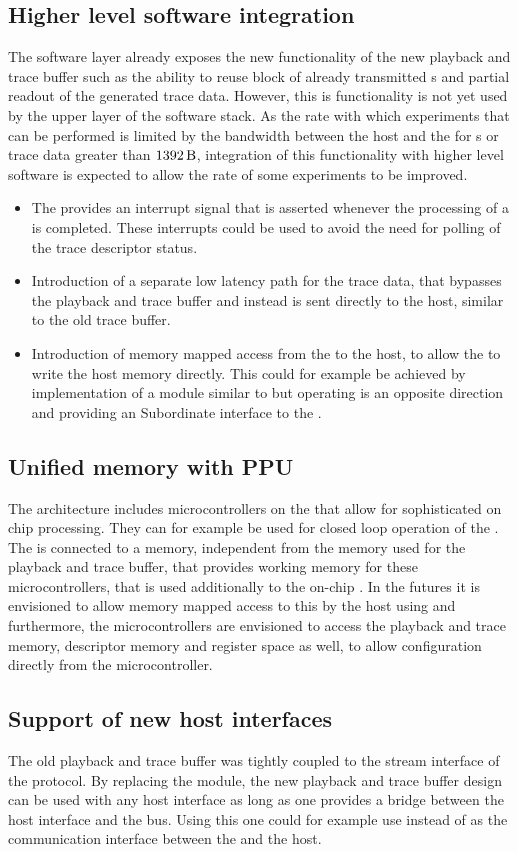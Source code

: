 \subsection{Higher level software integration}
The \ayo{} software layer already exposes the new functionality of the new playback and trace buffer such as the ability to reuse block of already transmitted \PlaybackProgram{}s and partial readout of the generated trace data. However, this is functionality is not yet used by the upper layer of the \BSS{} software stack. As the rate with which experiments that can be performed is limited by the bandwidth between the host and the \FPGA{} for \PlaybackProgram{}s or trace data greater than $\SI{1392}{\byte}$, integration of this functionality with higher level software is expected to allow the rate of some experiments to be improved.
\begin{itemize}
  \item The \AXIDMA{} provides an interrupt signal that is asserted whenever the processing of a \descriptor{} is completed. These interrupts could be used to avoid the need for polling of the trace descriptor status.
  \item Introduction of a separate low latency path for the trace data, that bypasses the playback and trace buffer and instead is sent directly to the host, similar to the old trace buffer.
  \item Introduction of memory mapped access from the \FPGA{} to the host, to allow the \FPGA{} to write the host memory directly. This could for example be achieved by implementation of a module similar to \FAXI{} but operating is an opposite direction and providing an \AXI{} Subordinate interface to the \FPGA{}.
\end{itemize}
\subsection{Unified memory with PPU}
The \BSSTwo{} architecture includes microcontrollers on the \ASIC{} that allow for sophisticated on chip processing. They can for example be used for closed loop operation of the \ASIC{}. The \FPGA{} is connected to a \DDR{} memory, independent from the \DDR{} memory used for the playback and trace buffer, that provides working memory for these microcontrollers, that is used additionally to the on-chip \SRAM{}. In the futures it is envisioned to allow memory mapped access to this \DDR{} by the host using \FAXI{} and furthermore, the microcontrollers are envisioned to access the playback and trace memory, descriptor memory and \AXIDMA{} register space as well, to allow configuration directly from the microcontroller.
\subsection{Support of new host interfaces}
The old playback and trace buffer was tightly coupled to the stream interface of the \HostARQ{} protocol. By replacing the \FAXI{} module, the new playback and trace buffer design can be used with any host interface as long as one provides a bridge between the host interface and the \AXI{} bus. Using this one could for example use \PCIe{} instead of \UDP{} as the communication interface between the \FPGA{} and the host.
